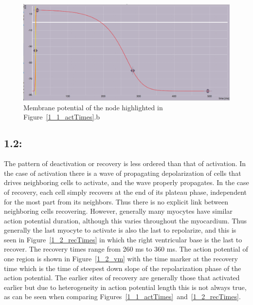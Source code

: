 \documentclass[12pt]{article}
\begin{document}
\begin{figure}[H]
	\centering
	\includegraphics[width=.95\linewidth]{Figures/1_1_actpotential.png}

	\caption{Membrane potential of the node highlighted in Figure~\ref{1_1_actTimes}.b}
	\label{1_1_vm}
\end{figure}

\subsection{1.2: }
The pattern of deactivation or recovery is less ordered than that of activation. In the case of activation there is a wave of propagating depolarization of cells that drives neighboring cells to activate, and the wave properly propagates. In the case of recovery, each cell simply recovers at the end of its plateau phase, independent for the most part from its neighbors. Thus there is no explicit link between neighboring cells recovering. However, generally many myocytes have similar action potential duration, although this varies throughout the myocardium. Thus generally the last myocyte to activate is also the last to repolarize, and this is seen in Figure~\ref{1_2_recTimes} in which the right ventricular base is the last to recover. The recovery times range from 260 ms to 360 ms. The action potential of one region is shown in Figure~\ref{1_2_vm} with the time marker at the recovery time which is the time of steepest down slope of the repolarization phase of the action potential. The earlier sites of recovery are generally those that activated earlier but due to heterogeneity in action potential length this is not always true, as can be seen when comparing Figures~\ref{1_1_actTimes}~and~\ref{1_2_recTimes}.
\end{document}
